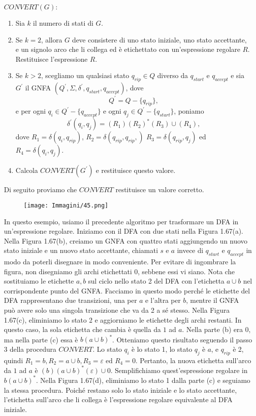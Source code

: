 \documentclass{article}
\begin{document}
$CONVERT(G):$
\begin{enumerate}
    \item Sia $k$ il numero di stati di $G$.
    \item Se $k = 2$, allora $G$ deve consistere di uno stato iniziale, uno stato accettante, e un signolo arco che li collega ed è etichettato con un'espressione regolare $R$. Restituisce l'espressione $R$.
    \item Se $k > 2$, scegliamo un qualsiasi stato $q_{rip} \in Q$ diverso da $q_{start}$ e $q_{accept}$ e sia $G^{'}$ il GNFA $(Q^{'},\Sigma,\delta^{'},q_{start},q_{accept})$, dove $$Q^{'} = Q - \{q_{rip}\},$$ e per ogni $q_i \in Q^{'} - \{q_{accept}\}$ e ogni $q_j \in Q^{'} - \{q_{start}\}$, poniamo $$ \delta^{'}(q_i,q_j) = (R_1)(R_2)^{*}(R_3) \cup (R_4),$$ dove $R_1 = \delta(q_i,q_{rip})$, $R_2 = \delta(q_{rip},q_{rip},)$ $R_3 = \delta(q_{rip},q_j)$ ed $R_4 = \delta (q_i,q_j)$.
    \item Calcola $CONVERT(G^{'})$ e restituisce questo valore. 
\end{enumerate}

Di seguito proviamo che $CONVERT$ restituisce un valore corretto.

\begin{figure}[H]
    \centering
    \texttt{[image: Immagini/45.png]}
    \label{fig:nuova_immagine}
\end{figure}

\begin{tcolorbox}[colback=yellow!10!white, colframe=yellow!50!black, title=Esempio 1.66]
    In questo esempio, usiamo il precedente algoritmo per trasformare un DFA in un'espressione regolare. Iniziamo con il DFA con due stati nella Figura 1.67(a).
Nella Figura 1.67(b), creiamo un GNFA con quattro stati aggiungendo un nuovo stato iniziale e un nuovo stato accettante, chiamati $s$ e $a$ invece di $q_{start}$ e $q_{accept}$ in modo da poterli disegnare in modo conveniente. Per evitare di ingombrare la figura, non disegniamo gli archi etichettati $0$, sebbene essi vi siano. Nota che sostituiamo le etichette $a,b$ sul ciclo nello stato 2 del DFA con l'etichetta $a\cup b$ nel corrispondente punto del GNFA. Facciamo in questo modo perché le etichette del DFA rappresentano due transizioni, una per $a$ e l'altra per $b$, mentre il GNFA può avere solo una singola transizione che va da 2 a sé stesso.
Nella Figura 1.67(c), eliminiamo lo stato 2 e aggiorniamo le etichette degli archi restanti. In questo caso, la sola etichetta che cambia è quella da $1$ ad $a$. Nella parte (b) era $0$, ma nella parte (c) essa è $b(a\cup b)^{*}$. Otteniamo questo risultato seguendo il passo 3 della procedura $CONVERT$. Lo stato $q_{i}$ è lo stato 1, lo stato $q_{j}$ è $a$, e $q_{rip}$ è 2, quindi $R_{1} = b, R_{2} = a\cup b, R_{3} = \varepsilon \text{ ed } R_{4} = 0$. Pertanto, la nuova etichetta sull'arco da $1$ ad $a$ è $(b)(a\cup b)^{*}(\varepsilon) \cup 0$. Semplifichiamo quest'espressione regolare in $b(a \cup b)^{*}$. Nella Figura 1.67(d), eliminiamo lo stato 1 dalla parte (c) e seguiamo la stessa procedura. Poiché restano solo lo stato iniziale e lo stato accettante, l'etichetta sull'arco che li collega è l'espressione regolare equivalente al DFA iniziale.
\end{tcolorbox}
\end{document}
